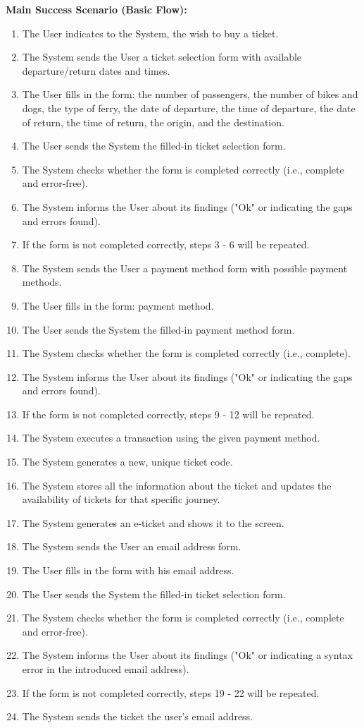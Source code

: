 \textbf{Main Success Scenario (Basic Flow):}
\begin{enumerate}
\item The User indicates to the System, the wish to buy a ticket.
\item The System sends the User a ticket selection form with available departure/return dates and times.
\item The User fills in the form: the number of passengers, the number of bikes and dogs, the type of ferry, the date of departure, the time of departure, the date of return, the time of return, the origin, and the destination.
\item The User sends the System the filled-in ticket selection form.
\item The System checks whether the form is completed correctly (i.e., complete and error-free).
\item The System informs the User about its findings ("Ok" or indicating the gaps and errors found).
\item If the form is not completed correctly, steps 3 - 6 will be repeated.
\item The System sends the User a payment method form with possible payment methods.
\item The User fills in the form: payment method.
\item The User sends the System the filled-in payment method form.
\item The System checks whether the form is completed correctly (i.e., complete).
\item The System informs the User about its findings ("Ok" or indicating the gaps and errors found).
\item If the form is not completed correctly, steps 9 - 12 will be repeated.
\item The System executes a transaction using the given payment method.
\item The System generates a new, unique ticket code.
\item The System stores all the information about the ticket and updates the availability of tickets for that specific journey.
\item The System generates an e-ticket and shows it to the screen.
\item The System sends the User an email address form.
\item The User fills in the form with his email address.
\item The User sends the System the filled-in ticket selection form.
\item The System checks whether the form is completed correctly (i.e., complete and error-free).
\item The System informs the User about its findings ("Ok" or indicating a syntax error in the introduced email address).
\item If the form is not completed correctly, steps 19 - 22 will be repeated.
\item The System sends the ticket the user's email address.
\end{enumerate}
